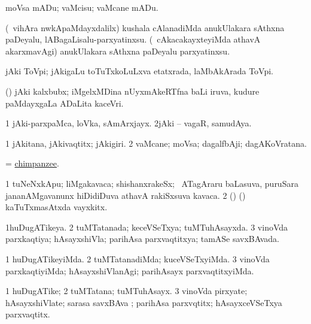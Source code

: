 \noindent
\gl{\akirx}
\bmng
moVsa mADu; vaMcisu; vaMcane mADu. 
\emng

\noindent
\gl{\nuga}
\bmng
{} 
\banum
{} (\kanmu\ vihAra nwkApaMdayxdalilx) kushala cAlanadiMda anukUlakara sAthxna paDeyalu, lABagaLisalu-parxyatinxsu. 
 (\kanmu\ cAkacakayxteyiMda athavA akarxmavAgi) anukUlakara sAthxna paDeyalu parxyatinxsu. 
\eanum
\emng
\eentry

\bentry
{}
\gl{\nA}
\bmng
jAki ToVpi; jAkigaLu toTuTxkoLuLxva etatxrada, laMbAkArada ToVpi. 
\emng
\eentry

\bentry
{}
\gl{\nA}
\bmng
(\birx) jAki kalxbubx; iMgelxMDina nUyxmAkeRTfna baLi iruva, kudure paMdayxgaLa ADaLita kaceVri. 
\emng
\eentry

\bentry
{}
\gl{\nA}
\bmng
\bnum
\num{1} jAki-parxpaMca, loVka, sAmArxjayx. 
\num{2}jAki -- vagaR, samudAya. 
\enum
\emng
\eentry

\bentry
{}
\gl{\nA}
\bmng
\bnum
\num{1} jAkitana, jAkivaqtitx; jAkigiri. 
\num{2} vaMcane; moVsa; dagalfbAji; dagAKoVratana. 
\enum
\emng
\eentry

\bentry
{}
\gl{\nA}
\bmng
= \hyperref{kandict_c.pdf}{C}{chimpanzee}{chimpanzee}. 
\emng
\eentry

\bentry
{}
\gl{\nA}
\bmng
\bnum
\num{1} tuNeNxkApu; liMgakavaca; shishanxrakeSx; \kanmu\ ATagAraru baLasuva, puruSara jananAMgavanunx hiDidiDuva athavA rakiSxsuva kavaca. 
\num{2} (\ame) (\ashi) kaTuTxmasAtxda vayxkitx. 
\enum
\emng
\eentry

\bentry
{}
\gl{\gu}
\bmng
\bnum
\num{1}huDugATikeya. 
\num{2} tuMTatanada; keceVSeTxya; tuMTuhAsayxda. 
\num{3} vinoVda parxkaqtiya; hAsayxshiVla; parihAsa parxvaqtitxya; tamASe savxBAvada. 
\enum
\emng
\eentry

\bentry
{}
\gl{\kirxvi}
\bmng
\bnum
\num{1} huDugATikeyiMda. 
\num{2} tuMTatanadiMda; kuceVSeTxyiMda. 
\num{3} vinoVda parxkaqtiyiMda; hAsayxshiVlanAgi; parihAsayx parxvaqtitxyiMda. 
\enum
\emng
\eentry

\bentry
{}
\gl{\nA}
\bmng
\bnum
\num{1} huDugATike; 
\num{2} tuMTatana; tuMTuhAsayx. 
\num{3} vinoVda pirxyate; hAsayxshiVlate; sarasa savxBAva ; parihAsa parxvqtitx; hAsayxceVSeTxya parxvaqtitx. 
\enum
\emng
\eentry

